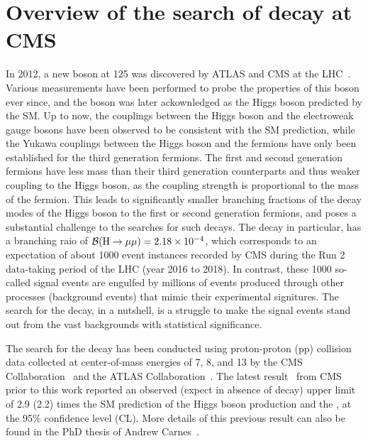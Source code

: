 \chapter{Overview of the search of \texorpdfstring{\hmm}{H to muons} decay at CMS}

In 2012, a new boson at 125 \GeV was discovered by ATLAS and CMS at the LHC~\cite{Aad:2012tfa, Chatrchyan:2012xdj, Chatrchyan:2013lba}. 
Various measurements have been performed to probe the properties of this boson ever since, 
and the boson was later ackownledged as the Higgs boson predicted by the SM.
Up to now, the couplings between the Higgs boson and the electroweak gauge bosons have been observed to be consistent with the SM prediction, 
while the Yukawa couplings between the Higgs boson and the fermions have only been established for the third generation fermions. 
The first and second generation fermions have less mass than their third generation counterparts and thus weaker coupling to the Higgs boson, 
as the coupling strength is proportional to the mass of the fermion.
This leads to significantly smaller branching fractions of the decay modes of the Higgs boson to the first or second generation fermions, 
and poses a substantial challenge to the searches for such decays.  
The \hmm decay in particular, has a branching raio of ${{\mathcal{B}(\mathrm{H} \to \mu\mu)} = 2.18 \times 10^{-4}}$, 
which corresponds to an expectation of about 1000 event instances recorded by CMS during the Run 2 data-taking period of the LHC (year 2016 to 2018).
In contrast, these 1000 so-called signal events are engulfed by millions of events produced through other processes (background events) that mimic their experimental signitures.
The search for the \hmm decay, in a nutshell, is a struggle to make the signal events stand out from the vast backgrounds with statistical significance.

The search for the \hmm decay has been conducted using proton-proton (pp) collision data collected at center-of-mass energies of 7, 8, and 13 \TeV
by the CMS Collaboration~\cite{2015184, PhysRevLett.122.021801} and the ATLAS Collaboration~\cite{201468, PhysRevLett.119.051802, Aad:2020xfq}.
The latest result~\cite{PhysRevLett.122.021801} from CMS prior to this work reported an observed (expect in absence of \hmm decay) upper limit of 2.9 (2.2) times the 
SM prediction of the Higgs boson production and the \brhmm, at the 95\% confidence level (CL).
More details of this previous result can also be found in the PhD thesis of Andrew Carnes~\cite{carnesthesis}.  

